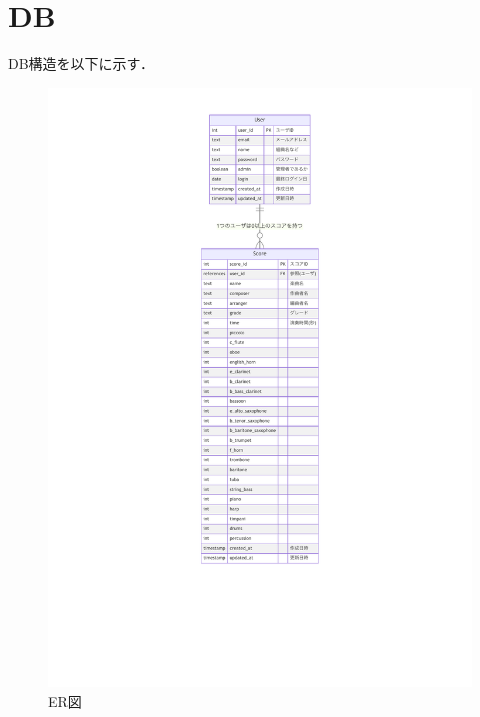 \chapter{DB}
DB構造を以下に示す．
\begin{figure}
	\centering
	\includegraphics[scale=0.8]{img/etc/db-er.pdf}
	\vspace{-1cm}
	\caption{ER図}
\end{figure}